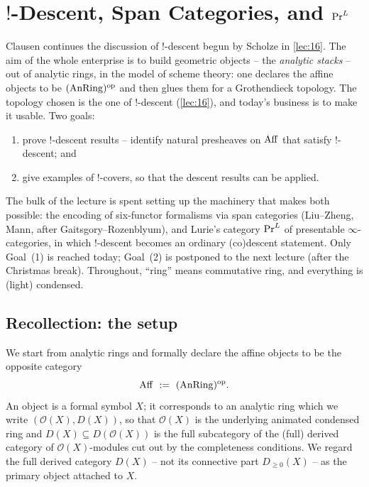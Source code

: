 \section{\texorpdfstring{$!$}{!}-Descent, Span Categories, and \texorpdfstring{$\mathrm{Pr}^{L}$}{PrL}}
\label{lec:17}

Clausen continues the discussion of $!$-descent begun by Scholze in \cref{lec:16}.
The aim of the whole enterprise is to build geometric objects -- the
\emph{analytic stacks} -- out of analytic rings, in the model of scheme theory:
one declares the affine objects to be $(\operatorname{AnRing})^{\mathrm{op}}$ and then glues them
for a Grothendieck topology. The topology chosen is the one of $!$-descent
(\cref{lec:16}), and today's business is to make it usable. Two goals:
\begin{enumerate}
\item prove $!$-descent results -- identify natural presheaves on
$\operatorname{Aff}$ that satisfy $!$-descent; and
\item give examples of $!$-covers, so that the descent results can be applied.
\end{enumerate}
The bulk of the lecture is spent setting up the machinery that makes both possible:
the encoding of six-functor formalisms via span categories (Liu--Zheng, Mann,
after Gaitsgory--Rozenblyum), and Lurie's category $\mathrm{Pr}^{L}$ of presentable
$\infty$-categories, in which $!$-descent becomes an ordinary (co)descent statement.
Only Goal~(1) is reached today; Goal~(2) is postponed to the next lecture (after the
Christmas break). Throughout, ``ring'' means commutative ring, and everything is
(light) condensed.

\subsection{Recollection: the setup}
\label{subsec:17:recollection}

We start from analytic rings and formally declare the affine objects to be the
opposite category
\begin{equation*}
\Aff\ :=\ (\AnRing)^{\mathrm{op}}.
\end{equation*}
An object is a formal symbol $X$; it corresponds to an analytic ring which we write
$(\mathcal O(X), D(X))$, so that $\mathcal O(X)$ is the underlying animated condensed
ring and $D(X)\subseteq D(\mathcal O(X))$ is the full subcategory of the (full) derived
category of $\mathcal O(X)$-modules cut out by the completeness conditions. We regard
the full derived category $D(X)$ -- not its connective part $D_{\ge0}(X)$ -- as the
primary object attached to $X$.

